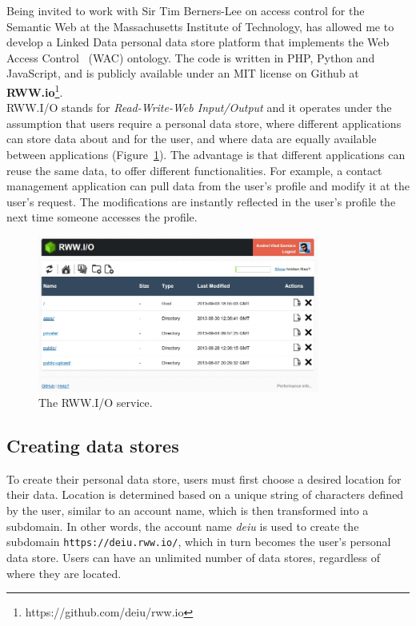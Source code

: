 Being invited to work with Sir Tim Berners-Lee on access control for the Semantic Web at the Massachusetts Institute of Technology, has allowed me to develop a Linked Data personal data store platform that implements the Web Access Control~\cite{hollenbach2009using} (WAC) ontology. The code is written in PHP, Python and JavaScript, and is publicly available under an MIT license on Github at \textbf{RWW.io}\footnote{https://github.com/deiu/rww.io}.\\

RWW.I/O stands for \textit{Read-Write-Web Input/Output} and it operates under the assumption that users require a personal data store, where different applications can store data about and for the user, and where data are equally available between applications (Figure~\ref{fig:rww}). The advantage is that different applications can reuse the same data, to offer different functionalities. For example, a contact management application can pull data from the user's profile and modify it at the user's request. The modifications are instantly reflected in the user's profile the next time someone accesses the profile.\\

\begin{figure}[h]
  \begin{center}
    \includegraphics[width=350px]{img/screens/rww.jpg}
        \caption{The RWW.I/O service.}
        \label{fig:rww}
  \end{center}
\end{figure}

\subsection{Creating data stores}
To create their personal data store, users must first choose a desired location for their data. Location is determined based on a unique string of characters defined by the user, similar to an account name, which is then transformed into a subdomain. In other words, the account name \textit{deiu} is used to create the subdomain \verb+https://deiu.rww.io/+, which in turn becomes the user's personal data store. Users can have an unlimited number of data stores, regardless of where they are located.\\

